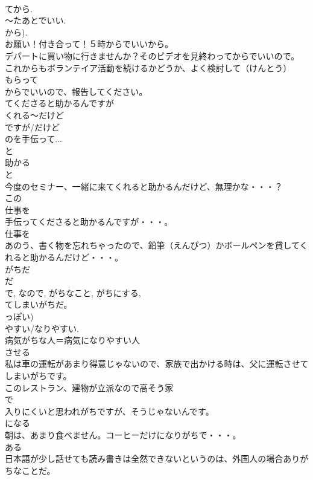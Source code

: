 \documentclass[8pt]{extreport}
\begin{document}
\begin{CJK}{UTF8}{min}
\\	てから.
\\	～たあとでいい.
\\	から). 
\\	お願い！付き合って！５時からでいいから。
\\	デパートに買い物に行きませんか？そのビデオを見終わってからでいいので。
\\	これからもボランテイア活動を続けるかどうか、よく検討して（けんとう）
\\	もらって
\\	からでいいので、報告してください。
\\	てくださると助かるんですが
\\	くれる～だけど
\\	ですが/だけど 
\\	のを手伝って...
\\	と 
\\	助かる 
\\	と
\\	今度のセミナー、一緒に来てくれると助かるんだけど、無理かな・・・？
\\	この
\\	仕事を
\\	手伝ってくださると助かるんですが・・・。
\\	仕事を 
\\	あのう、書く物を忘れちゃったので、鉛筆（えんぴつ）かボールペンを貸してくれると助かるんだけど・・・。
\\	がちだ
\\	だ 
\\	で, なので, がちなこと, がちにする, 
\\	てしまいがちだ。
\\	っぽい)
\\	やすい/なりやすい. 
\\	病気がちな人＝病気になりやすい人
\\	させる 
\\	私は車の運転があまり得意じゃないので、家族で出かける時は、父に運転させてしまいがちです。
\\	このレストラン、建物が立派なので高そう家
\\	で
\\	入りにくいと思われがちですが、そうじゃないんです。
\\	になる 
\\	朝は、あまり食べません。コーヒーだけになりがちで・・・。
\\	ある 
\\	日本語が少し話せても読み書きは全然できないというのは、外国人の場合ありがちなことだ。

\end{CJK}
\end{document}
